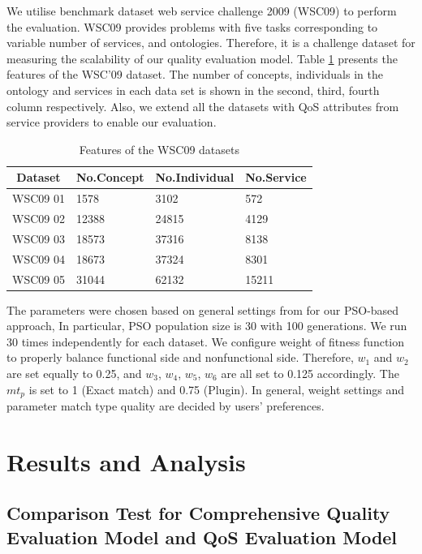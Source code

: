 \documentclass{llncs}
\begin{document}
We utilise benchmark dataset web service challenge 2009 (WSC09) \cite{kona2009wsc} to perform the evaluation. WSC09 provides problems with five tasks corresponding to variable number of services, and ontologies. Therefore, it is a challenge dataset for measuring the scalability of our quality evaluation model. Table \ref{wsc09datasetTable} presents the features of the WSC’09 dataset. The number of concepts, individuals in the ontology and services in each data set is shown in the second, third, fourth column respectively. Also, we extend all the datasets with QoS attributes from service providers to enable our evaluation. 

\begin{table}[]
\centering
\caption{Features of the WSC09 datasets}
\label{wsc09datasetTable}
\begin{tabular}{l|l|l|l}
\hline
\multicolumn{1}{c|}{Dataset} & No.Concept & No.Individual & No.Service \\ \hline
WSC09 01                     & 1578       &3102           &572      \\ \hline
WSC09 02                     & 12388      &24815          &4129      \\ \hline
WSC09 03                     & 18573      &37316          &8138      \\ \hline
WSC09 04                     & 18673      &37324          &8301      \\ \hline
WSC09 05                     & 31044      &62132          &15211    \\ \hline
\end{tabular}
\end{table}

The parameters were chosen based on general settings from \cite{shi2001particle} for our PSO-based approach, In particular, PSO population size is 30 with 100 generations. We run 30 times independently for each dataset. We configure weight of fitness function to properly balance functional side and nonfunctional side. Therefore, $w_{1}$ and $w_{2}$ are set equally to 0.25, and $w_{3}$, $w_{4}$, $w_{5}$, $w_{6}$ are all set to 0.125 accordingly. The $mt_{p}$ is set to 1 (Exact match) and 0.75 (Plugin). In general, weight settings and parameter match type quality are decided by users' preferences.


\section{Results and Analysis}\label{results_analysis}
\subsection{Comparison Test for Comprehensive Quality Evaluation Model and QoS Evaluation Model}\label{comparisonTest}
\end{document}
